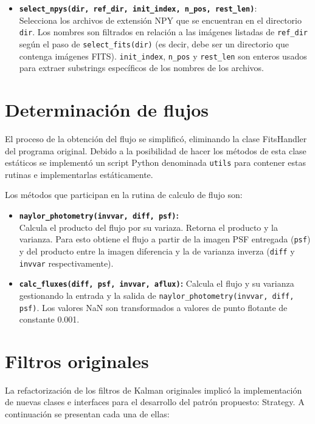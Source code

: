 \begin{itemize}
\item \textbf{\texttt{select\_npys(dir, ref\_dir, init\_index, n\_pos, rest\_len)}}:\\
Selecciona los archivos de extensi\'on NPY que se encuentran en el directorio \texttt{dir}. Los nombres son filtrados en relaci\'on a las im\'agenes listadas de \texttt{ref\_dir} seg\'un el paso de \texttt{select\_fits(dir)} (es decir, debe ser un directorio que contenga im\'agenes FITS). \texttt{init\_index}, \texttt{n\_pos} y \texttt{rest\_len} son enteros usados para extraer substrings espec\'ificos de los nombres de los archivos.
\end{itemize}

\section{Determinaci\'on de flujos}
El proceso de la obtenci\'on del flujo se simplific\'o, eliminando la clase FitsHandler del programa original. Debido a la posibilidad de hacer los m\'etodos de esta clase est\'aticos se implement\'o un script Python denominada \texttt{utils} para contener estas rutinas e implementarlas est\'aticamente.
\bigskip

Los m\'etodos que participan en la rutina de calculo de flujo son: 

\begin{itemize}
\item \textbf{\texttt{naylor\_photometry(invvar, diff, psf)}\cite{naylor}:}\\
Calcula el producto del flujo por su variaza. Retorna el producto y la varianza. Para esto obtiene el flujo a partir de la imagen PSF entregada (\texttt{psf}) y del producto entre la imagen diferencia y la de varianza inverza (\texttt{diff} y \texttt{invvar} respectivamente).
\bigskip


\item \textbf{\texttt{calc\_fluxes(diff, psf, invvar, aflux)}:}
Calcula el flujo y su varianza gestionando la entrada y la salida de \texttt{naylor\_photometry(invvar, diff, psf)}. Los valores NaN son transformados a valores de punto flotante de constante 0.001.

\end{itemize} 
\section{Filtros originales}
La refactorizaci\'on de los filtros de Kalman originales implic\'o la implementaci\'on de nuevas clases e interfaces para el desarrollo del patr\'on propuesto: Strategy. A continuaci\'on se presentan cada una de ellas:

